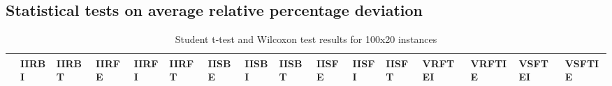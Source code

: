 \documentclass[a4paper,12pt]{article}
\begin{document}
\newpage\cleardoublepage{}
\begin{landscape}
\section{Statistical tests on average relative percentage deviation}
\label{app:stat}
\begin{table}[H]
\begin{center}
\caption{Student t-test and Wilcoxon test results for 100x20 instances}
\label{app:stat/table/100x20}
\tiny
\tabcolsep=0.11cm
\begin{tabular}{|l|l|l|l|l|l|l|l|l|l|l|l|l|l|l|l|}
\hline
& \textbf{IIRBI} & \textbf{IIRBT} & \textbf{IIRFE} & \textbf{IIRFI} & \textbf{IIRFT} & \textbf{IISBE} & \textbf{IISBI} & \textbf{IISBT} & \textbf{IISFE} & \textbf{IISFI} & \textbf{IISFT} & \textbf{VRFTEI} & \textbf{VRFTIE} & \textbf{VSFTEI} & \textbf{VSFTIE}\\
\hline

\end{tabular}
\end{center}
\end{table}
\end{landscape}
\end{document}
